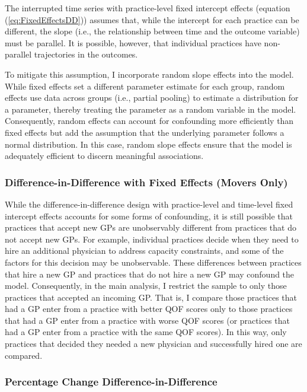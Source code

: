 \documentclass[11pt]{article}
\begin{document}
The interrupted time series with practice-level fixed intercept effects (equation (\ref{eq:FixedEffectsDD})) assumes that, while the intercept for each practice can be different, the slope (i.e., the relationship between time and the outcome variable) must be parallel. It is possible, however, that individual practices have non-parallel trajectories in the outcomes.

To mitigate this assumption, I incorporate random slope effects into the model. While fixed effects set a different parameter estimate for each group, random effects use data across groups (i.e., partial pooling) to estimate a distribution for a parameter, thereby treating the parameter as a random variable in the model. Consequently, random effects can account for confounding more efficiently than fixed effects but add the assumption that the underlying parameter follows a normal distribution. In this case, random slope effects ensure that the model is adequately efficient to discern meaningful associations.



\subsubsection{Difference-in-Difference with Fixed Effects (Movers Only)}
\label{sec:MainAnalysis}

While the difference-in-difference design with practice-level and time-level fixed intercept effects accounts for some forms of confounding, it is still possible that practices that accept new GPs are unobservably different from practices that do not accept new GPs. For example, individual practices decide when they need to hire an additional physician to address capacity constraints, and some of the factors for this decision may be unobservable. These differences between practices that hire a new GP and practices that do not hire a new GP may confound the model. Consequently, in the main analysis, I restrict the sample to only those practices that accepted an incoming GP. That is, I compare those practices that had a GP enter from a practice with better QOF scores only to those practices that had a GP enter from a practice with worse QOF scores (or practices that had a GP enter from a practice with the same QOF scores). In this way, only practices that decided they needed a new physician and successfully hired one are compared.



\subsubsection{Percentage Change Difference-in-Difference}
\end{document}
